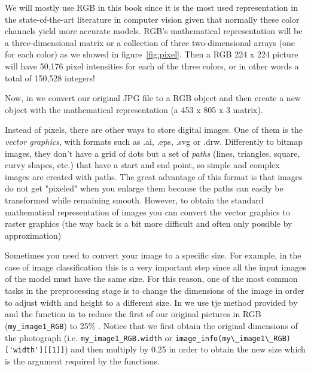 We will mostly use RGB in this book since it is the most used representation in the state-of-the-art literature in computer vision given that normally these color channels yield more accurate models. RGB's mathematical representation will be a three-dimensional matrix or a collection of three two-dimensional arrays (one for each color) as we showed in figure~\ref{fig:pixel}. Then a RGB 224 x 224 picture will have 50,176 pixel intensities for each of the three colors, or in other words a total of 150,528 integers!

Now, in  we convert our original JPG file to a RGB object and then create a new object with the mathematical representation (a 453 x 805 x 3 matrix).


Instead of pixels, there are other ways to store digital images. One of them is the \textit{vector graphics}, with formats such as .ai, .eps, .svg or .drw. Differently to bitmap images, they don't have a grid of dots but a set of \textit{paths} (lines, triangles, square, curvy shapes, etc.) that have a start and end point, so simple and complex images are created with paths. The great advantage of this format is that images do not get "pixeled" when you enlarge them because the paths can easily be transformed 	while remaining smooth. However, to obtain the standard mathematical representation of images you can convert the vector graphics to raster graphics (the way back is a bit more difficult and often only possible by approximation)

Sometimes you need to convert your image to a specific size. For example, in the case of image classification this is a very important step since all the input images of the model must have the same size. For this reason, one of the most common tasks in the preprocessing stage is to change the dimensions of the image in order to adjust width and height to a different size. In  we use tje  method provided by  and the  function in  to reduce the first of our original pictures in RGB (\texttt{my\_image1\_RGB}) to 25\% . Notice that we first obtain the original dimensions of the photograph (i.e. \texttt{my\_image1\_RGB.width} or \verb|image_info(my\_image1\_RGB)['width'][[1]]|) and then multiply by 0.25 in order to obtain the new size which is the argument required by the functions.

